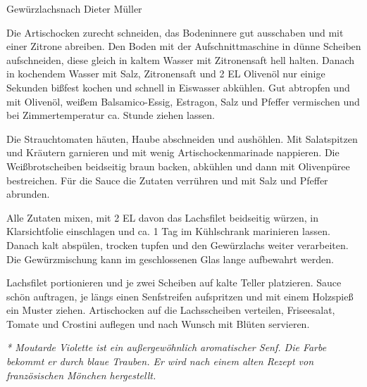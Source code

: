 \begin{recipe}{Gewürzlachs}{nach Dieter Müller}




  \steps
  Die Artischocken zurecht schneiden, das Bodeninnere gut ausschaben und mit einer Zitrone
  abreiben.  Den Boden mit der Aufschnittmaschine in dünne Scheiben aufschneiden, diese
  gleich in kaltem Wasser mit Zitronensaft hell halten.  Danach in kochendem Wasser mit
  Salz, Zitronensaft und 2 EL Olivenöl nur einige Sekunden bißfest kochen und schnell in
  Eiswasser abkühlen.  Gut abtropfen und mit Olivenöl, weißem Balsamico-Essig, Estragon,
  Salz und Pfeffer vermischen und bei Zimmertemperatur ca. \halb Stunde ziehen lassen.

  Die Strauchtomaten häuten, Haube abschneiden und aushöhlen. Mit Salatspitzen und
  Kräutern garnieren und mit wenig Artischockenmarinade nappieren. Die Weißbrotscheiben
  beidseitig braun backen, abkühlen und dann mit Olivenpüree bestreichen. Für die Sauce
  die Zutaten verrühren und mit Salz und Pfeffer abrunden.

  Alle Zutaten mixen, mit 2 EL davon das Lachsfilet beidseitig würzen, in Klarsichtfolie
  einschlagen und ca. 1 Tag im Kühlschrank marinieren lassen.  Danach kalt abspülen,
  trocken tupfen und den Gewürzlachs weiter verarbeiten.  Die Gewürzmischung kann im
  geschlossenen Glas lange aufbewahrt werden.

  Lachsfilet portionieren und je zwei Scheiben auf kalte Teller platzieren. Sauce schön
  auftragen, je längs einen Senfstreifen aufspritzen und mit einem Holzspieß ein Muster
  ziehen.  Artischocken auf die Lachsscheiben verteilen, Friseesalat, Tomate und Crostini
  auflegen und nach Wunsch mit Blüten servieren.

  \textit{* Moutarde Violette ist ein außergewöhnlich aromatischer Senf. Die Farbe bekommt er
  durch blaue Trauben. Er wird nach einem alten Rezept von französischen Mönchen
  hergestellt.}
\end{recipe}
